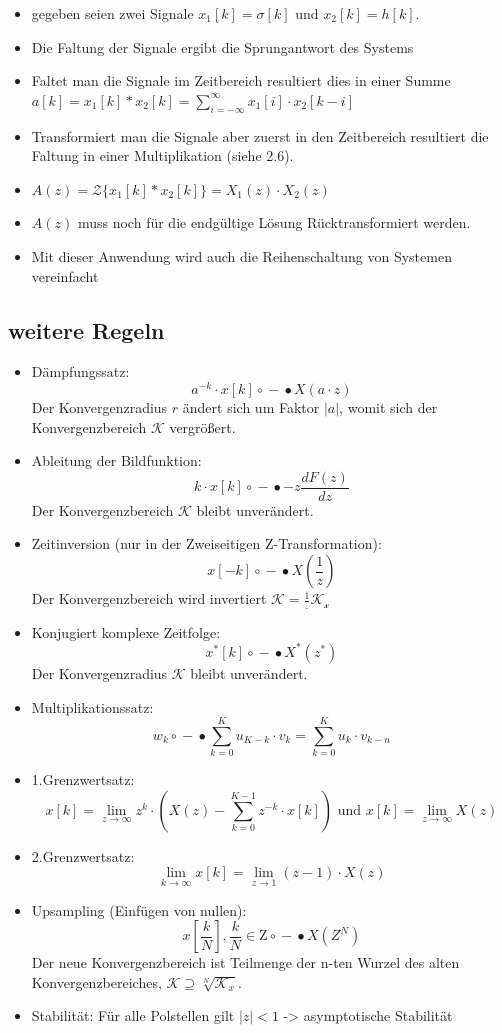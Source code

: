 \documentclass[11pt]{article}
\begin{document}
\begin{itemize}
\item
  gegeben seien zwei Signale \(x_1[k] = \sigma[k]\) und
  \(x_2[k] = h[k]\).
\item
  Die Faltung der Signale ergibt die Sprungantwort des Systems
\item
  Faltet man die Signale im Zeitbereich resultiert dies in einer Summe
  \(a[k] = x_1[k] * x_2[k] = \sum_{i=-\infty}^{\infty} x_1[i] \cdot x_2[k-i]\)
\item
  Transformiert man die Signale aber zuerst in den Zeitbereich
  resultiert die Faltung in einer Multiplikation (siehe 2.6).
\item
  \(A(z) = \mathcal{Z} \{x_1[k] * x_2[k]\} = X_1(z) \cdot X_2(z)\)
\item
  \(A(z)\) muss noch für die endgültige Lösung Rücktransformiert werden.
\item
  Mit dieser Anwendung wird auch die Reihenschaltung von Systemen
  vereinfacht
\end{itemize}

    \subsection{weitere Regeln}\label{weitere-regeln}

\begin{itemize}
\item
  Dämpfungssatz:
  \[a^{-k} \cdot x[k] \circ \!\!-\!\!\bullet X(a \cdot z)\] Der
  Konvergenzradius \(r\) ändert sich um Faktor \(|a|\), womit sich der
  Konvergenzbereich \(\mathcal{K}\) vergrößert.
\item
  Ableitung der Bildfunktion:
  \[k \cdot x[k] \circ \!\!-\!\!\bullet -z \frac{dF(z)}{dz}\] Der
  Konvergenzbereich \(\mathcal{K}\) bleibt unverändert.
\item
  Zeitinversion (nur in der Zweiseitigen Z-Transformation):
  \[x[-k] \circ \!\!-\!\!\bullet X(\frac{1}{z})\] Der Konvergenzbereich
  wird invertiert \(\mathcal{K} = \frac{1}.{\mathcal{K_x}}\)
\item
  Konjugiert komplexe Zeitfolge:
  \[x^{*}[k] \circ \!\!-\!\!\bullet X^{*}(z^{*})\] Der Konvergenzradius
  \(\mathcal{K}\) bleibt unverändert.
\item
  Multiplikationssatz:
  \[w_k \circ \!\!-\!\!\bullet \sum_{k=0}^K u_{K-k} \cdot v_k = \sum_{k=0}^K u_{k} \cdot v_{k-n}\]
\item
  1.Grenzwertsatz:
  \[x[k] = \lim_{z\to\infty} z^k \cdot (X(z) - \sum_{k=0}^{K-1} z^{-k} \cdot x[k]) \textrm{ und } x[k] = \lim_{z\to\infty} X(z)\]
\item
  2.Grenzwertsatz:
  \[\lim_{k\to\infty} x[k] = \lim_{z\to 1} (z-1)\cdot X(z)\]
\item
  Upsampling (Einfügen von nullen):
  \[x[\frac{k}{N}], \frac{k}{N} \in\mathrm{Z} \circ \!\!-\!\!\bullet X(Z^N)\]
  Der neue Konvergenzbereich ist Teilmenge der n-ten Wurzel des alten
  Konvergenzbereiches,
  \(\mathcal{K} \supseteq \sqrt[N]{\mathcal{K}_x}\).
\item
  Stabilität: Für alle Polstellen gilt \(|z| < 1\) -\textgreater{}
  asymptotische Stabilität
\end{itemize}
\end{document}
